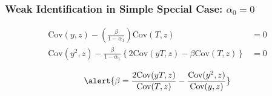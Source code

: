 \documentclass{beamer}
\begin{document}
%
\begin{frame}
  \frametitle{Weak Identification in Simple Special Case: $\alpha_0 = 0$}
  \begin{align*}
    \mbox{Cov}(y,z) - \left( \frac{\beta}{1 - \alpha_1} \right) \mbox{Cov}(T,z) &= 0\\
  \mbox{Cov}(y^2,z) - \frac{\beta}{1 - \alpha_1}\left\{2\mbox{Cov}(yT,z)- \beta \mbox{Cov}(T,z)\right\} &= 0
  \end{align*}

  \vspace{1em}
  \[
    \alert{\beta = \frac{2\mbox{Cov}(yT,z)}{\mbox{Cov}(T,z)} - \frac{\mbox{Cov}(y^2,z)}{\mbox{Cov}(y,z)}}
  \]

\end{frame}
\end{document}
